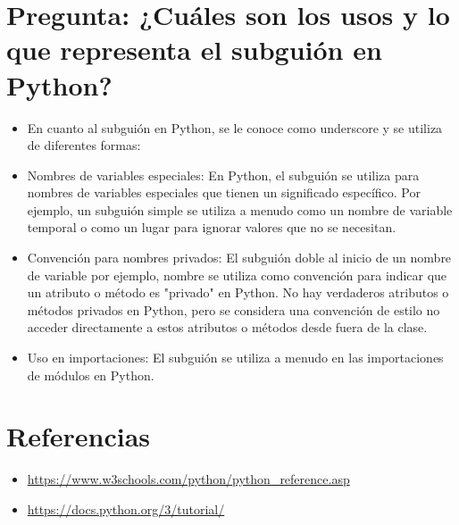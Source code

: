 \documentclass{article}
\begin{document}
	\section{Pregunta: ¿Cuáles son los usos y lo que representa el subguión en Python?}
	\begin{itemize}
		\item En cuanto al subguión en Python, se le conoce como underscore y se utiliza de diferentes formas:
		\item Nombres de variables especiales: En Python, el subguión se utiliza para nombres de variables especiales que tienen un significado específico. Por ejemplo, un subguión simple se utiliza a menudo como un nombre de variable temporal o como un lugar para ignorar valores que no se necesitan.
		\item Convención para nombres privados: El subguión doble al inicio de un nombre de variable por ejemplo, nombre se utiliza como convención para indicar que un atributo o método es "privado" en Python. No hay verdaderos atributos o métodos privados en Python, pero se considera una convención de estilo no acceder directamente a estos atributos o métodos desde fuera de la clase.
		\item Uso en importaciones: El subguión se utiliza a menudo en las importaciones de módulos en Python.
	\end{itemize}		

\section{Referencias}
\begin{itemize}			
	\item \url{https://www.w3schools.com/python/python_reference.asp}
	\item \url{https://docs.python.org/3/tutorial/}
\end{itemize}	
	
%
%
%
			
\end{document}
